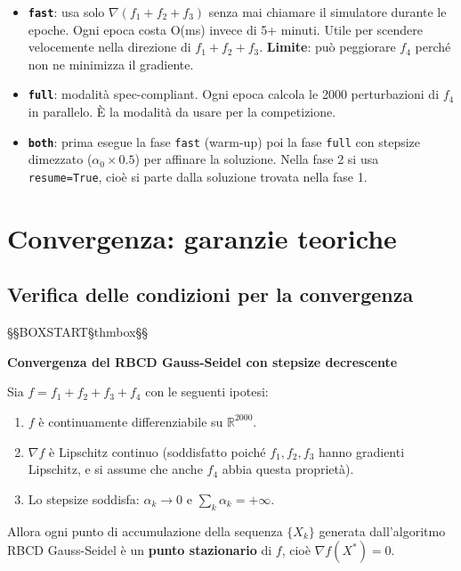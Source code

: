 \documentclass[12pt,a4paper]{article}
\theoremstyle{definition}
\newcommand{\R}{\mathbb{R}}
\newcommand{\grad}{\nabla}
\begin{document}
\begin{itemize}
  \item \textbf{\texttt{fast}}: usa solo $\grad(f_1 + f_2 + f_3)$ senza mai chiamare il
        simulatore durante le epoche. Ogni epoca costa O(ms) invece di 5+ minuti.
        Utile per scendere velocemente nella direzione di $f_1 + f_2 + f_3$.
        \textbf{Limite}: può peggiorare $f_4$ perché non ne minimizza il gradiente.
  \item \textbf{\texttt{full}}: modalità spec-compliant. Ogni epoca calcola le 2000 perturbazioni
        di $f_4$ in parallelo. È la modalità da usare per la competizione.
  \item \textbf{\texttt{both}}: prima esegue la fase \texttt{fast} (warm-up) poi la fase
        \texttt{full} con stepsize dimezzato ($\alpha_0 \times 0.5$) per affinare la soluzione.
        Nella fase 2 si usa \texttt{resume=True}, cioè si parte dalla soluzione trovata nella fase 1.
\end{itemize}

\section{Convergenza: garanzie teoriche}

\subsection{Verifica delle condizioni per la convergenza}



\noindent §§BOXSTART§thmbox§§

\textbf{Convergenza del RBCD Gauss-Seidel con stepsize decrescente}


Sia $f = f_1 + f_2 + f_3 + f_4$ con le seguenti ipotesi:
\begin{enumerate}
  \item $f$ è continuamente differenziabile su $\R^{2000}$.
  \item $\grad f$ è Lipschitz continuo (soddisfatto poiché $f_1, f_2, f_3$ hanno gradienti
        Lipschitz, e si assume che anche $f_4$ abbia questa proprietà).
  \item Lo stepsize soddisfa: $\alpha_k \to 0$ e $\sum_k \alpha_k = +\infty$.
\end{enumerate}
Allora ogni punto di accumulazione della sequenza $\{X_k\}$ generata dall'algoritmo RBCD
Gauss-Seidel è un \textbf{punto stazionario} di $f$, cioè $\grad f(X^*) = 0$.
\end{document}
